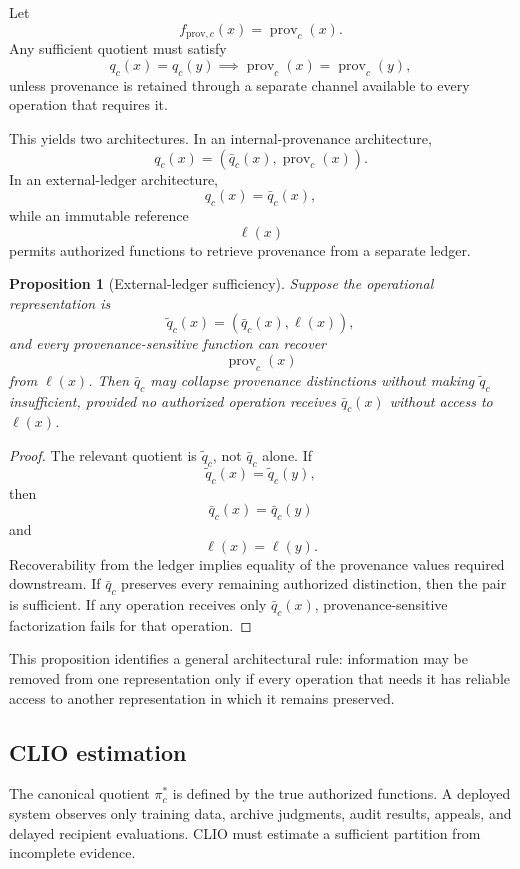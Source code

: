 \documentclass[11pt]{article}
\newtheorem{proposition}[definition]{Proposition}
\theoremstyle{definition}
\begin{document}
Let
\[
f_{\mathrm{prov},c}(x)
=
\operatorname{prov}_c(x).
\]
Any sufficient quotient must satisfy
\[
q_c(x)=q_c(y)
\implies
\operatorname{prov}_c(x)
=
\operatorname{prov}_c(y),
\]
unless provenance is retained through a separate channel available to every operation that requires it.

This yields two architectures. In an internal-provenance architecture,
\[
q_c(x)
=
(\bar q_c(x),\operatorname{prov}_c(x)).
\]
In an external-ledger architecture,
\[
q_c(x)
=
\bar q_c(x),
\]
while an immutable reference
\[
\ell(x)
\]
permits authorized functions to retrieve provenance from a separate ledger.

\begin{proposition}[External-ledger sufficiency]
Suppose the operational representation is
\[
\widetilde q_c(x)
=
(\bar q_c(x),\ell(x)),
\]
and every provenance-sensitive function can recover
\[
\operatorname{prov}_c(x)
\]
from \(\ell(x)\). Then \(\bar q_c\) may collapse provenance distinctions without making \(\widetilde q_c\) insufficient, provided no authorized operation receives \(\bar q_c(x)\) without access to \(\ell(x)\).
\end{proposition}

\begin{proof}
The relevant quotient is \(\widetilde q_c\), not \(\bar q_c\) alone. If
\[
\widetilde q_c(x)
=
\widetilde q_c(y),
\]
then
\[
\bar q_c(x)=\bar q_c(y)
\]
and
\[
\ell(x)=\ell(y).
\]
Recoverability from the ledger implies equality of the provenance values required downstream. If \(\bar q_c\) preserves every remaining authorized distinction, then the pair is sufficient. If any operation receives only \(\bar q_c(x)\), provenance-sensitive factorization fails for that operation.
\end{proof}

This proposition identifies a general architectural rule: information may be removed from one representation only if every operation that needs it has reliable access to another representation in which it remains preserved.

\subsection{CLIO estimation}

The canonical quotient \(\pi_c^{*}\) is defined by the true authorized functions. A deployed system observes only training data, archive judgments, audit results, appeals, and delayed recipient evaluations. CLIO must estimate a sufficient partition from incomplete evidence.
\end{document}
